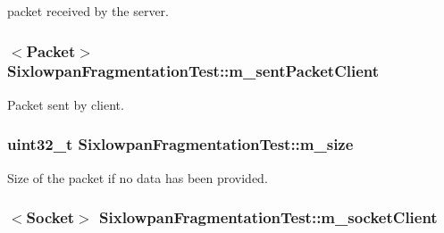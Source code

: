 packet received by the server. 

\subsubsection[{\texorpdfstring{m\+\_\+sent\+Packet\+Client}{m_sentPacketClient}}]{$<${\bf Packet}$>$ Sixlowpan\+Fragmentation\+Test\+::m\+\_\+sent\+Packet\+Client\hspace{0.3cm}{\ttfamily [private]}}\hypertarget{classSixlowpanFragmentationTest_a0931362b2249617e59dde62b9a8d41dc}{}\label{classSixlowpanFragmentationTest_a0931362b2249617e59dde62b9a8d41dc}


Packet sent by client. 

\subsubsection[{\texorpdfstring{m\+\_\+size}{m_size}}]{\setlength{\rightskip}{0pt plus 5cm}uint32\+\_\+t Sixlowpan\+Fragmentation\+Test\+::m\+\_\+size\hspace{0.3cm}{\ttfamily [private]}}\hypertarget{classSixlowpanFragmentationTest_abf8b0d59da8d99e941ec337a40f5548a}{}\label{classSixlowpanFragmentationTest_abf8b0d59da8d99e941ec337a40f5548a}


Size of the packet if no data has been provided. 

\subsubsection[{\texorpdfstring{m\+\_\+socket\+Client}{m_socketClient}}]{$<${\bf Socket}$>$ Sixlowpan\+Fragmentation\+Test\+::m\+\_\+socket\+Client\hspace{0.3cm}{\ttfamily [private]}}\hypertarget{classSixlowpanFragmentationTest_a3d87ff33f33f43ba585f5772c0bdbd83}{}\label{classSixlowpanFragmentationTest_a3d87ff33f33f43ba585f5772c0bdbd83}


